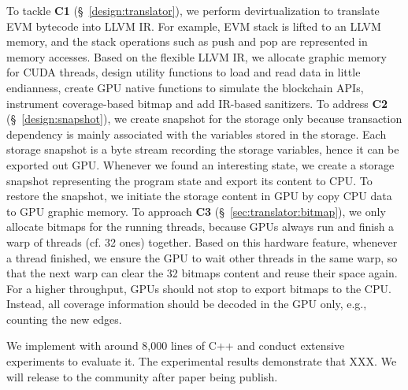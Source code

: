 

To tackle \textbf{C1} (\S~\ref{design:translator}), we perform devirtualization to translate EVM bytecode into LLVM IR. For example, EVM stack is lifted to an LLVM memory, and the stack operations such as push and pop are represented in memory accesses. Based on the flexible LLVM IR, we allocate graphic memory for CUDA threads, design utility functions to load and read data in little endianness, create GPU native functions to simulate the blockchain APIs, instrument coverage-based bitmap and add IR-based sanitizers.
%
To address \textbf{C2} (\S~\ref{design:snapshot}), we create snapshot for the storage only because transaction dependency is mainly associated with the variables stored in the storage. 
Each storage snapshot is a byte stream recording the storage variables, hence it can be exported out GPU. 
Whenever we found an interesting state, we create a storage snapshot representing the program state and export its content to CPU. To restore the snapshot, we initiate the storage content in GPU by copy CPU data to GPU graphic memory.
%
To approach \textbf{C3} (\S~\ref{sec:translator:bitmap}), we only allocate bitmaps for the running threads, because GPUs always run and finish a warp of threads (cf. 32 ones) together\cite{nvidia2021cuda}. 
Based on this hardware feature, whenever a thread finished, we ensure the GPU to wait other threads in the same warp, so that the next warp can clear the 32 bitmaps content and reuse their space again. 
%
For a higher throughput, GPUs should not stop to export bitmaps to the CPU.
Instead, all coverage information should be decoded in the GPU only, e.g., counting the new edges. 

We implement {\tool} with around 8,000 lines of C++ and conduct extensive experiments to evaluate it. 
The experimental results demonstrate that {\tool} XXX. 
We will release {\tool} to the community after paper being publish.



